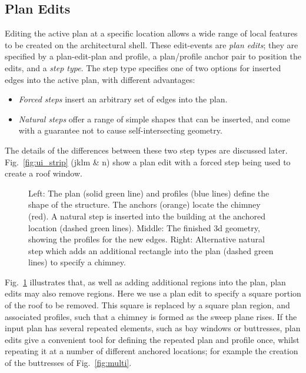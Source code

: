 \subsection{Plan Edits}

Editing the active plan at a specific location allows a wide range of local features to be created on the architectural shell. These edit-events are \emph{plan edits}; they are specified by a plan-edit-plan and profile, a plan/profile anchor pair to position the edits, and a \emph{step type}. The step type specifies one of two options for inserted edges into the active plan, with different advantages:

\begin{itemize}
\item{\emph{Forced steps} insert an arbitrary set of edges into the plan.} 
\item{\emph{Natural steps} offer a range of simple shapes that can be inserted, and come with a guarantee not to cause self-intersecting geometry.}
\end{itemize}

The details of the differences between these two step types are discussed later. Fig.~\ref{fig:ui_strip} (jklm \& n) show a plan edit with a forced step being used to create a roof window.

\begin{figure}
  \centering
 \def\svgwidth{1.0\columnwidth}
  
  \caption[Adding a chimney using plan edits.]{\label{fig:Chimney}
Left: The plan (solid green line) and profiles (blue lines) define the shape of the structure. The anchors (orange) locate the chimney (red). A natural step is inserted into the building at the anchored location (dashed green lines). Middle: The finished 3d geometry, showing the profiles for the new edges. Right: Alternative natural step which adds an additional rectangle into the plan (dashed green lines) to specify a chimney. }
\end{figure}

Fig.~\ref{fig:Chimney} illustrates that, as well as adding additional regions into the plan, plan edits may also remove regions. Here we use a plan edit to specify a square portion of the roof to be removed. This square is replaced by a square plan region, and associated profiles, such that a chimney is formed as the sweep plane rises. 
If the input plan has several repeated elements, such as bay windows or buttresses, plan edits give a convenient tool for defining the repeated plan and profile once, whilst repeating it at a number of different anchored locations; for example the creation of the buttresses of Fig.~\ref{fig:multi}.

